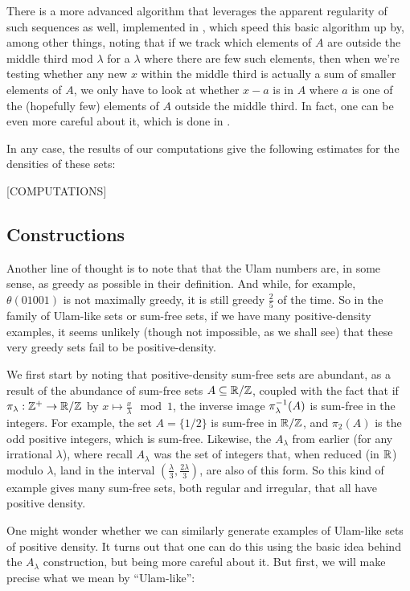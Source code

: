 \documentclass{report}
\theoremstyle{remark}
\numberwithin{equation}{section}
\begin{document}
There is a more advanced algorithm that leverages the apparent
regularity of such sequences as well, implemented in
\cite{knuth:note}, which speed this basic algorithm up by, among
other things, noting that if we track which elements of $A$ are
outside the middle third mod $\lambda$ for a $\lambda$ where there are
few such elements, then when we're testing whether any new $x$ within
the middle third is actually a sum of smaller elements of $A$, we only
have to look at whether $x - a$ is in $A$ where $a$ is one of the
(hopefully few) elements of $A$ outside the middle third.  In fact,
one can be even more careful about it, which is done in
\cite{knuth:note}.

In any case, the results of our computations give the following
estimates for the densities of these sets: 

{\color{red}[COMPUTATIONS]}

\subsection{Constructions}

Another line of thought is to note that that the Ulam numbers are, in
some sense, as greedy as possible in their definition.  And while, for
example, $\theta(01001)$ is not maximally greedy, it is still greedy
$\frac25$ of the time.  So in the family of Ulam-like sets or sum-free
sets, if we have many positive-density examples, it seems unlikely
(though not impossible, as we shall see) that these very greedy sets
fail to be positive-density.  

We first start by noting that positive-density sum-free sets are
abundant, as a result of the abundance of sum-free sets
$A \subseteq \mathbb{R}/\mathbb{Z}$, coupled with the fact that if
$\pi_\lambda : \mathbb{Z}^+ \to \mathbb{R}/\mathbb{Z}$ by
$x \mapsto \frac{x}{\lambda} \mod{1}$, the inverse image
$\pi_\lambda^{-1}(A)$ is sum-free in the integers.  For example, the
set $A = \{1/2\}$ is sum-free in $\mathbb{R}/\mathbb{Z}$, and $\pi_2(A)$ is the odd
positive integers, which is sum-free.  Likewise, the $A_\lambda$ from
earlier (for any irrational $\lambda$), where recall $A_\lambda$ was
the set of integers that, when reduced (in $\mathbb{R}$) modulo $\lambda$,
land in the interval $(\frac{\lambda}{3}, \frac{2\lambda}{3})$, are
also of this form.  So this kind of example gives many sum-free sets,
both regular and irregular, that all have positive density.

One might wonder whether we can similarly generate examples of
Ulam-like sets of positive density.  It turns out that one can do this
using the basic idea behind the $A_\lambda$ construction, but being
more careful about it.  But first, we will make precise what we mean
by ``Ulam-like'': 
\end{document}
